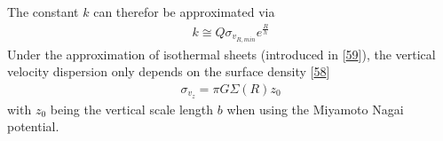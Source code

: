 \documentclass[letterpaper,10pt,english]{sphinxmanual}
\begin{document}
\sphinxAtStartPar
The constant \(k\) can therefor be approximated via
\begin{equation}\label{equation:NBodySimulation/Initialization:radial_velocity_dispersion_constant}
\begin{split}k \cong Q \sigma_{v_{R,min}}e^{\frac{R}{h}}\end{split}
\end{equation}
\sphinxAtStartPar
Under the approximation of isothermal sheets (introduced in {[}\hyperlink{cite.NBodySimulation/Appendix:id14}{59}{]}), the vertical velocity dispersion only depends on the surface density {[}\hyperlink{cite.NBodySimulation/Appendix:id15}{58}{]}
\begin{equation}\label{equation:NBodySimulation/Initialization:vertical_velocity_dispersion}
\begin{split}\sigma_{v_{z}} = \pi G \Sigma \left ( R \right )z_{0}\end{split}
\end{equation}
\sphinxAtStartPar
with \(z_{0}\) being the vertical scale length \(b\) when using the Miyamoto Nagai potential.
\end{document}
